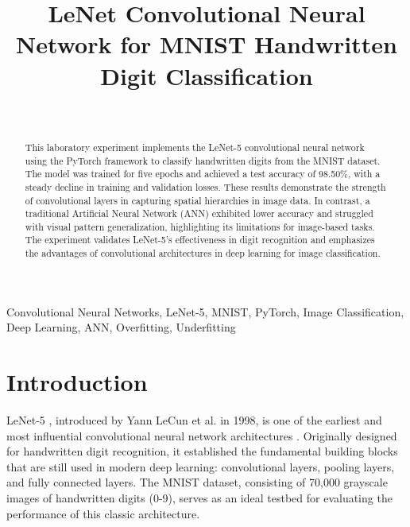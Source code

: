 \documentclass[a4paper, journal]{IEEEtran}
\begin{document}
\title{LeNet Convolutional Neural Network for MNIST Handwritten Digit Classification}
\author{
     \\
    }

\maketitle

\begin{abstract}
    This laboratory experiment implements the LeNet-5 convolutional neural network using the PyTorch framework to classify handwritten digits from the MNIST dataset. The model was trained for five epochs and achieved a test accuracy of 98.50\%, with a steady decline in training and validation losses. These results demonstrate the strength of convolutional layers in capturing spatial hierarchies in image data. In contrast, a traditional Artificial Neural Network (ANN) exhibited lower accuracy and struggled with visual pattern generalization, highlighting its limitations for image-based tasks. The experiment validates LeNet-5’s effectiveness in digit recognition and emphasizes the advantages of convolutional architectures in deep learning for image classification.



\end{abstract}

\begin{IEEEkeywords}
    Convolutional Neural Networks, LeNet-5, MNIST, PyTorch, Image Classification, Deep Learning, ANN, Overfitting, Underfitting
\end{IEEEkeywords}

\section{Introduction}

LeNet-5 , introduced by Yann LeCun et al. in 1998, is one of the earliest and most influential convolutional neural network architectures \cite{lecun1998gradient}. Originally designed for handwritten digit recognition, it established the fundamental building blocks that are still used in modern deep learning: convolutional layers, pooling layers, and fully connected layers. The MNIST dataset, consisting of 70,000 grayscale images of handwritten digits (0-9), serves as an ideal testbed for evaluating the performance of this classic architecture.
\end{document}

